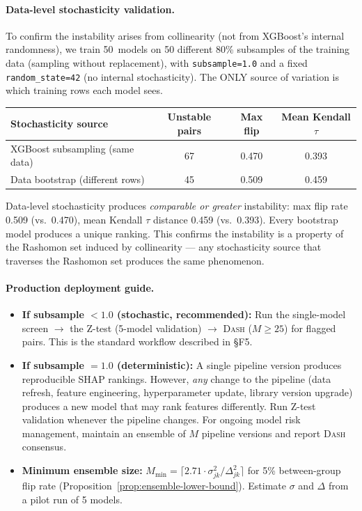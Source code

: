 \documentclass{article}
\newcommand{\DASH}{\textsc{Dash}}
\begin{document}
\paragraph{Data-level stochasticity validation.}
To confirm the instability arises from collinearity (not from XGBoost's
internal randomness), we train 50~models on 50 different 80\% subsamples
of the training data (sampling without replacement), with \texttt{subsample=1.0} and a fixed
\texttt{random\_state=42} (no internal stochasticity). The ONLY
source of variation is which training rows each model sees.

\begin{center}
\small
\begin{tabular}{@{}lccc@{}}
\toprule
Stochasticity source & Unstable pairs & Max flip & Mean Kendall $\tau$ \\
\midrule
XGBoost subsampling (same data) & 67 & 0.470 & 0.393 \\
Data bootstrap (different rows) & 45 & 0.509 & 0.459 \\
\bottomrule
\end{tabular}
\end{center}

Data-level stochasticity produces \emph{comparable or greater}
instability: max flip rate 0.509 (vs.\ 0.470), mean Kendall
$\tau$ distance 0.459 (vs.\ 0.393). Every bootstrap model produces
a unique ranking. This confirms the instability is a property of
the Rashomon set induced by collinearity --- any stochasticity source
that traverses the Rashomon set produces the same phenomenon.

\paragraph{Production deployment guide.}
\begin{itemize}
  \item \textbf{If subsample $< 1.0$ (stochastic, recommended):}
    Run the single-model screen $\to$ the Z-test (5-model validation) $\to$
    \DASH{} ($M \geq 25$) for flagged pairs. This is the standard
    workflow described in \S F5.
  \item \textbf{If subsample $= 1.0$ (deterministic):} A single
    pipeline version produces reproducible SHAP rankings. However,
    \emph{any} change to the pipeline (data refresh, feature
    engineering, hyperparameter update, library version upgrade)
    produces a new model that may rank features differently. Run Z-test
    validation whenever the pipeline changes. For ongoing model risk
    management, maintain an ensemble of $M$ pipeline versions and
    report \DASH{} consensus.
  \item \textbf{Minimum ensemble size:}
    $M_{\min} = \lceil 2.71 \cdot \sigma_{jk}^2 / \Delta_{jk}^2 \rceil$
    for 5\% between-group flip rate
    (Proposition~\ref{prop:ensemble-lower-bound}).
    Estimate $\sigma$ and $\Delta$ from a pilot run of 5 models.
\end{itemize}
\end{document}
